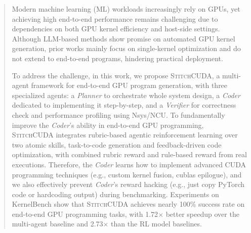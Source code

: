 \documentclass{article}
\theoremstyle{plain}
\theoremstyle{definition}
\theoremstyle{remark}
\begin{document}
\begin{abstract}


Modern machine learning (ML) workloads increasingly rely on GPUs, yet achieving high end-to-end performance remains challenging due to dependencies on both GPU kernel efficiency and host-side settings.
Although LLM-based methods show promise on automated GPU kernel generation, prior works mainly focus on single-kernel optimization and do not extend to end-to-end programs, hindering practical deployment.

To address the challenge, in this work, we propose \textsc{StitchCUDA}, a multi-agent framework for end-to-end GPU program generation, with three specialized agents: a \textit{Planner} to orchestrate whole system design, a \textit{Coder} dedicated to implementing it step-by-step, and a \textit{Verifier} for correctness check and performance profiling using Nsys/NCU. To fundamentally improve the \textit{Coder}'s ability in end-to-end GPU programming, \textsc{StitchCUDA} integrates rubric-based agentic reinforcement learning over two atomic skills, task-to-code generation and feedback-driven code optimization, with combined rubric reward and rule-based reward from real executions. Therefore, the \textit{Coder} learns how to implement advanced CUDA programming techniques (e.g., custom kernel fusion, cublas epilogue), and we also effectively prevent \textit{Coder}'s reward hacking (e.g., just copy PyTorch code or hardcoding output) during benchmarking.
Experiments on KernelBench show that \textsc{StitchCUDA} achieves nearly 100\% success rate on end-to-end GPU programming tasks, with 1.72$\times$  better speedup over the multi-agent baseline and 2.73$\times$ than the RL model baselines.





\end{abstract}







\end{document}
